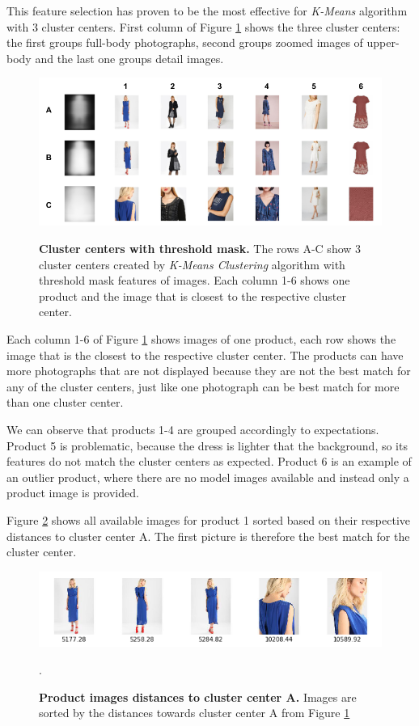 \documentclass{article}
\begin{document}
This feature selection has proven to be the most effective for \textit{K-Means} algorithm with 3 cluster centers. First column of Figure \ref{fig:cluster_outline} shows the three cluster centers: the first groups full-body photographs, second groups zoomed images of upper-body and the last one groups detail images. 

\begin{figure}[h]
\centering
{\includegraphics[width=\linewidth]{clustering/outlines_clusters}}
\caption{\label{fig:cluster_outline} \textbf{Cluster centers with threshold mask.} The rows A-C show 3 cluster centers created by \textit{K-Means Clustering} algorithm with threshold mask features of images. Each column 1-6 shows one product and the image that is closest to the respective cluster center.}
\end{figure}

Each column 1-6 of Figure \ref{fig:cluster_outline} shows images of one product, each row shows the image that is the closest to the respective cluster center. The products can have more photographs that are not displayed because they are not the best match for any of the cluster centers, just like one photograph can be best match for more than one cluster center. 

We can observe that products 1-4 are grouped accordingly to expectations. Product 5 is problematic, because the dress is lighter that the background, so its features do not match the cluster centers as expected. Product 6 is an example of an outlier product, where there are no model images available and instead only a product image is provided.

Figure \ref{fig:cluster_outline_distances} shows all available images for product 1 sorted based on their respective distances to cluster center A. The first picture is therefore the best match for the cluster center.

\begin{figure}[h]
\centering
{\includegraphics[width=\linewidth]{clustering/outlines_distances}}
\caption{\label{fig:cluster_outline_distances} \textbf{Product images distances to cluster center A.} Images are sorted by the distances towards cluster center A from Figure \ref{fig:cluster_outline}}.
\end{figure}
\end{document}
